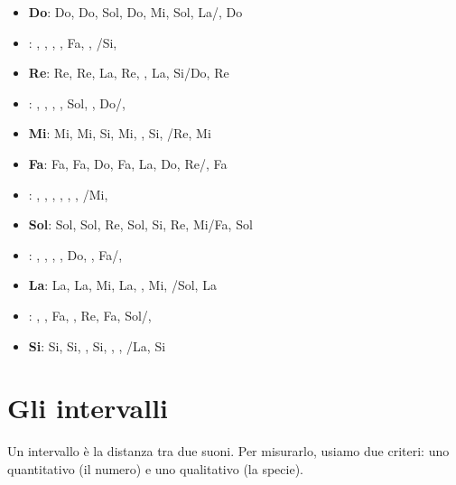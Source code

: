 \begin{itemize}
	\label{itemize:elenco_armonici}
	
	\item \textbf{Do}: Do, Do, Sol, Do, Mi, Sol, La/\Ladiesis , Do
	
	\item \textbf{\Dodiesis }: \Dodiesis , \Dodiesis , \Soldiesis , \Dodiesis , Fa, \Soldiesis , \Ladiesis /Si, \Dodiesis 
	
	\item \textbf{Re}: Re, Re, La, Re, \Fadiesis , La, Si/Do, Re
	
	\item \textbf{\Rediesis }: \Rediesis , \Rediesis , \Ladiesis , \Rediesis , Sol, \Ladiesis , Do/\Dodiesis , \Rediesis 
	
	\item \textbf{Mi}: Mi, Mi, Si, Mi, \Soldiesis , Si, \Dodiesis /Re, Mi
	
	\item \textbf{Fa}: Fa, Fa, Do, Fa, La, Do, Re/\Rediesis , Fa
	
	\item \textbf{\Fadiesis }: \Fadiesis , \Fadiesis , \Dodiesis , \Fadiesis , \Ladiesis , \Dodiesis , \Rediesis /Mi, \Fadiesis 
	
	\item \textbf{Sol}: Sol, Sol, Re, Sol, Si, Re, Mi/Fa, Sol
	
	\item \textbf{\Soldiesis }: \Soldiesis , \Soldiesis , \Rediesis , \Soldiesis , Do, \Rediesis , Fa/\Fadiesis , \Soldiesis 
	
	\item \textbf{La}: La, La, Mi, La, \Dodiesis , Mi, \Fadiesis /Sol, La
	
	\item \textbf{\Ladiesis }: \Ladiesis , \Ladiesis , Fa, \Ladiesis , Re, Fa, Sol/\Soldiesis , \Ladiesis 
	
	\item \textbf{Si}: Si, Si, \Fadiesis , Si, \Rediesis , \Fadiesis , \Soldiesis /La, Si
	
\end{itemize}


\section{Gli intervalli}
\label{sec:intervalli}

Un intervallo è la distanza tra due suoni. Per misurarlo, usiamo due criteri: uno quantitativo (il numero) e uno qualitativo (la specie).

